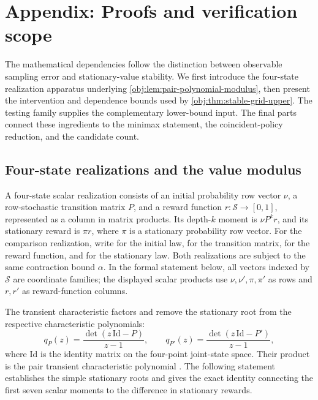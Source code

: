 \section{Appendix: Proofs and verification scope}

The mathematical dependencies follow the distinction between observable sampling error and stationary-value stability. We first introduce the four-state realization apparatus underlying \cref{obj:lem:pair-polynomial-modulus}, then present the intervention and dependence bounds used by \cref{obj:thm:stable-grid-upper}. The testing family supplies the complementary lower-bound input. The final parts connect these ingredients to the minimax statement, the coincident-policy reduction, and the candidate count.

\subsection{Four-state realizations and the value modulus}

A four-state scalar realization consists of an initial probability row vector \(\nu\), a row-stochastic transition matrix \(P\), and a reward function \(r\colon\mathcal S\to[0,1]\), represented as a column in matrix products. Its depth-\(k\) moment is \(\nu P^k r\), and its stationary reward is \(\pi r\), where \(\pi\) is a stationary probability row vector. For the comparison realization, write  for the initial law,  for the transition matrix,  for the reward function, and  for the stationary law. Both realizations are subject to the same contraction bound \(\alpha\). In the formal statement below, all vectors indexed by \(\mathcal S\) are coordinate families; the displayed scalar products use \(\nu,\nu',\pi,\pi'\) as rows and \(r,r'\) as reward-function columns.

The transient characteristic factors  and  remove the stationary root from the respective characteristic polynomials:
\[
q_P(z)=\frac{\det(z\,\mathrm{Id}-P)}{z-1},
\qquad
q_{P'}(z)=\frac{\det(z\,\mathrm{Id}-P')}{z-1},
\]
where \(\mathrm{Id}\) is the identity matrix on the four-point joint-state space. Their product is the pair transient characteristic polynomial . The following statement establishes the simple stationary roots and gives the exact identity connecting the first seven scalar moments to the difference in stationary rewards.

